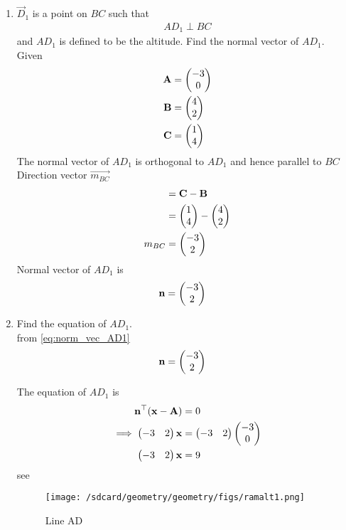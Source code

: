 \documentclass[11pt]{book}
\begin{document}
\begin{enumerate}[label=\thesection.\arabic*.,ref=\thesection.\theenumi]

\item $\vec{D}_1$ is a point on $BC$ such that
\begin{align}
AD_1 \perp BC
\end{align}
and $AD_1$ is defined to be the altitude. Find the normal vector of $AD_1$.
  \\   \solution Given  \\
  \begin{align} 
 \mathbf{A} &= \begin{pmatrix} -3\\ 0 \end{pmatrix} \\
 \mathbf{B} &= \begin{pmatrix} 4\\ 2 \end{pmatrix}\\
 \mathbf{C} &= \begin{pmatrix} 1\\ 4\end{pmatrix}
 \end{align}
The normal vector of $AD_{1}$ is orthogonal to $AD_1$ and hence parallel to $BC$ \\ Direction vector $\vec{m_{BC}}$ 
\begin{align}
    &=\mathbf{C}-\mathbf{B}\\
    &=\begin{pmatrix}1 \\ 4\end{pmatrix} -\begin{pmatrix}4 \\2\end{pmatrix} \\
    m_{BC} &= \begin{pmatrix}-3 \\ 2\end{pmatrix}
\end{align}
Normal vector of $AD_1$ is
\begin{align}
\label{eq:norm_vec_AD1}
	\vec{n} &= 
\myvec{-3\\2}
\end{align}

\item Find the equation of $AD_1$.
 \\    \solution from \eqref{eq:norm_vec_AD1} 
 \begin{align}
	\mathbf{n} &= 
\begin{pmatrix}-3\\2\end{pmatrix}
\end{align}

The equation of $AD_1$ is
\begin{align}
 \mathbf{n}^{\top}(\mathbf{x-A}) &= 0 \\
\implies \begin{pmatrix}-3 & 2\end{pmatrix}\mathbf{x} &= \begin{pmatrix}-3& 2\end{pmatrix}\begin{pmatrix}-3 \\ 0\end{pmatrix}\\
\begin{pmatrix}-3 & 2\end{pmatrix}\mathbf{x} &= 9
\end{align}
see 
\begin{figure}[H]
    \centering
    \texttt{[image: /sdcard/geometry/geometry/figs/ramalt1.png]}
    \caption{Line AD}
    \label{fig:line_ad}
\end{figure}
 

\end{enumerate}
\end{document}
